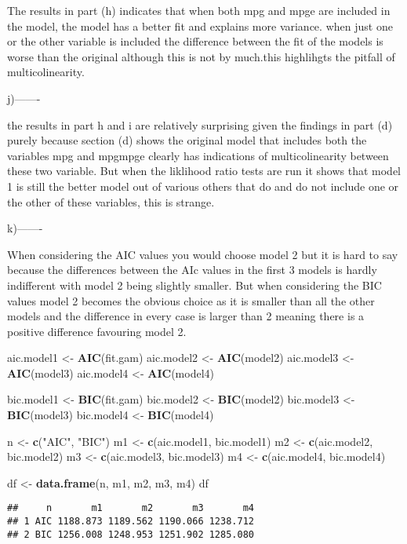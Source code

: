 \documentclass[]{article}
\newenvironment{Shaded}{\begin{snugshade}}{\end{snugshade}}
\newcommand{\KeywordTok}[1]{\textcolor[rgb]{0.13,0.29,0.53}{\textbf{#1}}}
\newcommand{\NormalTok}[1]{#1}
\newcommand{\StringTok}[1]{\textcolor[rgb]{0.31,0.60,0.02}{#1}}
\begin{document}
The results in part (h) indicates that when both mpg and mpge are
included in the model, the model has a better fit and explains more
variance. when just one or the other variable is included the difference
between the fit of the models is worse than the original although this
is not by much.this highlihgts the pitfall of multicolinearity.

j)-------

the results in part h and i are relatively surprising given the findings
in part (d) purely because section (d) shows the original model that
includes both the variables mpg and mpgmpge clearly has indications of
multicolinearity between these two variable. But when the liklihood
ratio tests are run it shows that model 1 is still the better model out
of various others that do and do not include one or the other of these
variables, this is strange.

k)-------

When considering the AIC values you would choose model 2 but it is hard
to say because the differences between the AIc values in the first 3
models is hardly indifferent with model 2 being slightly smaller. But
when considering the BIC values model 2 becomes the obvious choice as it
is smaller than all the other models and the difference in every case is
larger than 2 meaning there is a positive difference favouring model 2.

\begin{Shaded}
\begin{Highlighting}[]
\NormalTok{aic.model1 <-}\StringTok{ }\KeywordTok{AIC}\NormalTok{(fit.gam)}
\NormalTok{aic.model2 <-}\StringTok{ }\KeywordTok{AIC}\NormalTok{(model2)}
\NormalTok{aic.model3 <-}\StringTok{ }\KeywordTok{AIC}\NormalTok{(model3)}
\NormalTok{aic.model4 <-}\StringTok{ }\KeywordTok{AIC}\NormalTok{(model4)}

\NormalTok{bic.model1 <-}\StringTok{ }\KeywordTok{BIC}\NormalTok{(fit.gam)}
\NormalTok{bic.model2 <-}\StringTok{ }\KeywordTok{BIC}\NormalTok{(model2)}
\NormalTok{bic.model3 <-}\StringTok{ }\KeywordTok{BIC}\NormalTok{(model3)}
\NormalTok{bic.model4 <-}\StringTok{ }\KeywordTok{BIC}\NormalTok{(model4)}


\NormalTok{n <-}\StringTok{ }\KeywordTok{c}\NormalTok{(}\StringTok{"AIC"}\NormalTok{, }\StringTok{"BIC"}\NormalTok{)}
\NormalTok{m1 <-}\StringTok{ }\KeywordTok{c}\NormalTok{(aic.model1, bic.model1)}
\NormalTok{m2 <-}\StringTok{ }\KeywordTok{c}\NormalTok{(aic.model2, bic.model2)}
\NormalTok{m3 <-}\StringTok{ }\KeywordTok{c}\NormalTok{(aic.model3, bic.model3)}
\NormalTok{m4 <-}\StringTok{ }\KeywordTok{c}\NormalTok{(aic.model4, bic.model4)}

\NormalTok{df <-}\StringTok{ }\KeywordTok{data.frame}\NormalTok{(n, m1, m2, m3, m4)}
\NormalTok{df}
\end{Highlighting}
\end{Shaded}

\begin{verbatim}
##     n       m1       m2       m3       m4
## 1 AIC 1188.873 1189.562 1190.066 1238.712
## 2 BIC 1256.008 1248.953 1251.902 1285.080
\end{verbatim}
\end{document}
